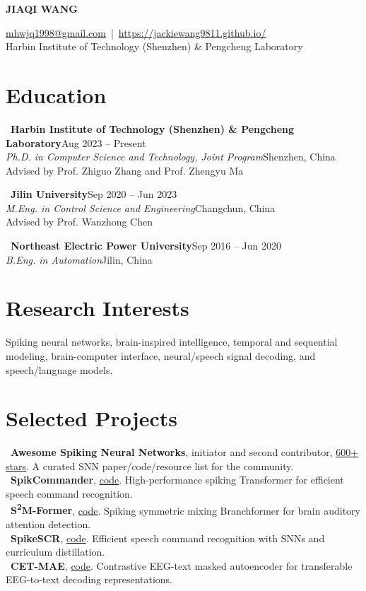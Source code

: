 \documentclass[10pt,a4paper]{article}
\newcommand{\cvname}[1]{\begin{center}{\Huge\bfseries\MakeUppercase{#1}}\end{center}}
\newcommand{\cvheader}[3]{\begin{center}\href{mailto:#1}{#1} \,|\, \href{#2}{#2}\\[3pt]#3\end{center}}
\newcommand{\entry}[4]{
  \textbullet\ \textbf{#1}\hfill #2\\
  \textit{#3}\hfill #4
}
\begin{document}
\fontsize{9.7}{10.8}\selectfont

\cvname{Jiaqi Wang}
\cvheader{mhwjq1998@gmail.com}{https://jackiewang9811.github.io/}{Harbin Institute of Technology (Shenzhen) \& Pengcheng Laboratory}

\section*{Education}
\entry{Harbin Institute of Technology (Shenzhen) \& Pengcheng Laboratory}{Aug 2023 -- Present}
{Ph.D. in Computer Science and Technology, Joint Program}{Shenzhen, China}\\
Advised by Prof. Zhiguo Zhang and Prof. Zhengyu Ma
\vspace{4pt}

\entry{Jilin University}{Sep 2020 -- Jun 2023}
{M.Eng. in Control Science and Engineering}{Changchun, China}\\
Advised by Prof. Wanzhong Chen
\vspace{4pt}

\entry{Northeast Electric Power University}{Sep 2016 -- Jun 2020}
{B.Eng. in Automation}{Jilin, China}

\section*{Research Interests}
Spiking neural networks, brain-inspired intelligence, temporal and sequential modeling, brain-computer interface, neural/speech signal decoding, and speech/language models.

\section*{Selected Projects}
\textbullet\ \textbf{Awesome Spiking Neural Networks}, initiator and second contributor, \href{https://github.com/zhouchenlin2096/Awesome-Spiking-Neural-Networks}{600+ stars}. A curated SNN paper/code/resource list for the community.\\
\textbullet\ \textbf{SpikCommander}, \href{https://github.com/JackieWang9811/SCommander}{code}. High-performance spiking Transformer for efficient speech command recognition.\\
\textbullet\ \textbf{S\textsuperscript{2}M-Former}, \href{https://github.com/JackieWang9811/S2M-Former}{code}. Spiking symmetric mixing Branchformer for brain auditory attention detection.\\
\textbullet\ \textbf{SpikeSCR}, \href{https://github.com/JackieWang9811/SpikeSCR}{code}. Efficient speech command recognition with SNNs and curriculum distillation.\\
\textbullet\ \textbf{CET-MAE}, \href{https://github.com/JackieWang9811/CET-MAE}{code}. Contrastive EEG-text masked autoencoder for transferable EEG-to-text decoding representations.
\end{document}
